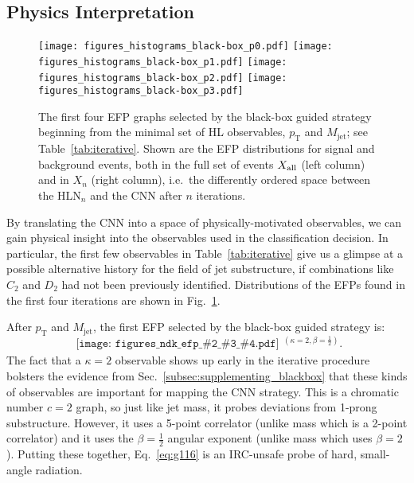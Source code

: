 \documentclass[aps,prd,twocolumn,superscriptaddress,preprintnumbers,nofootinbib,longbibliography,floatfix]{revtex4-1}
\newcommand{\Fig}[1]{Fig.~\ref{#1}}
\newcommand{\Tab}[1]{Table~\ref{#1}}
\newcommand{\Sec}[1]{Sec.~\ref{#1}}
\newcommand{\Eq}[1]{Eq.~\eqref{#1}}
\newcommand{\ndk}[4]{
	\begin{gathered}\texttt{[image: figures\_ndk\_efp\_\#2\_\#3\_\#4.pdf]}\end{gathered}
}
\begin{document}
\subsection{Physics Interpretation}
\label{subsec:iteratively_physics}
\begin{figure}[t]
	\centering
	\texttt{[image: figures\_histograms\_black-box\_p0.pdf]}
	\texttt{[image: figures\_histograms\_black-box\_p1.pdf]}
	\texttt{[image: figures\_histograms\_black-box\_p2.pdf]}
	\texttt{[image: figures\_histograms\_black-box\_p3.pdf]}
    \caption{The first four EFP graphs selected by the black-box guided strategy beginning from the minimal set of HL observables, $p_{\textrm{T}}$ and $M_{\textrm{jet}}$; see Table~\ref{tab:iterative}. Shown are the EFP distributions for signal and background events, both in the full set of events $X_{\rm all}$ (left column) and in $X_n$ (right column), i.e.\ the differently ordered space between the HLN$_n$ and the CNN after $n$ iterations.}
\label{fig:efp_dist_iterative}
\end{figure}

By translating the CNN into a space of physically-motivated observables, we can gain physical insight into the observables used in the classification decision. In particular, the first few observables in \Tab{tab:iterative} give us a glimpse at a possible alternative history for the field of jet substructure, if combinations like $C_2$ and $D_2$ had not been previously identified. Distributions of the EFPs found in the first four iterations are shown in \Fig{fig:efp_dist_iterative}.

After $p_{\textrm{T}}$ and $M_{\textrm{jet}}$, the first EFP selected by the black-box guided strategy is:
\begin{equation}
	\label{eq:g116}
	\ndk{0.045}{5}{5}{4} {}^{\left(\kappa = 2, \beta = \tfrac{1}{2} \right)}.
\end{equation}
The fact that a $\kappa = 2$ observable shows up early in the iterative procedure bolsters the evidence from \Sec{subsec:supplementing_blackbox} that these kinds of observables are important for mapping the CNN strategy. This is a chromatic number $c = 2$ graph, so just like jet mass, it probes deviations from 1-prong substructure. However, it uses a 5-point correlator (unlike mass which is a 2-point correlator) and it uses the $\beta = \frac{1}{2}$ angular exponent (unlike mass which uses $\beta = 2$). Putting these together, \Eq{eq:g116} is an IRC-unsafe probe of hard, small-angle radiation.
\end{document}
